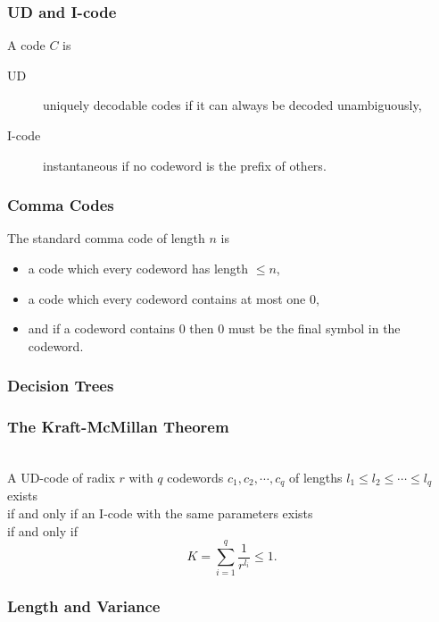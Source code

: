 \documentclass{article}
\begin{document}
\subsubsection{UD and I-code}

A code $C$ is

\begin{description}
    \item[UD] uniquely decodable codes if it can always be decoded unambiguously,
    \item[I-code] instantaneous if no codeword is the prefix of others.
\end{description}

\subsubsection{Comma Codes}

The standard comma code of length $n$ is

\begin{itemize}
    \item a code which every codeword has length $\leq n$,
    \item a code which every codeword contains at most one $0$,
    \item and if a codeword contains $0$ then $0$ must be the final symbol in the codeword.
\end{itemize}

\subsubsection{Decision Trees}

\subsubsection{The Kraft-McMillan Theorem}

\begin{theorem}
    \mbox{}\\
    A UD-code of radix $r$ with $q$ codewords $c_{1}, c_{2},\cdots,c_{q}$ of lengths $l_{1} \leq l_{2} \leq \cdots \leq l_{q}$ exists \\
    if and only if \qquad an I-code with the same parameters exists \\
    if and only if
    \[K=\sum_{i=1}^{q}\dfrac{1}{r^{l_{i}}}\leq1.\]
\end{theorem}

\subsubsection{Length and Variance}
\end{document}
